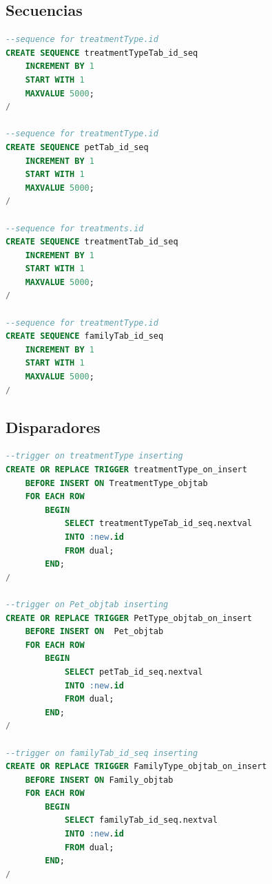 \documentclass{FR16}
\begin{document}
\subsection{Secuencias}
\begin{lstlisting}[language=Sql, basicstyle=\scriptsize]
--sequence for treatmentType.id
CREATE SEQUENCE treatmentTypeTab_id_seq
    INCREMENT BY 1
    START WITH 1
    MAXVALUE 5000;
/

--sequence for treatmentType.id
CREATE SEQUENCE petTab_id_seq
    INCREMENT BY 1
    START WITH 1
    MAXVALUE 5000;
/

--sequence for treatments.id
CREATE SEQUENCE treatmentTab_id_seq
    INCREMENT BY 1
    START WITH 1
    MAXVALUE 5000;
/

--sequence for treatmentType.id
CREATE SEQUENCE familyTab_id_seq
    INCREMENT BY 1
    START WITH 1
    MAXVALUE 5000;
/
\end{lstlisting}
\newpage

\subsection{Disparadores}
\begin{lstlisting}[language=Sql, basicstyle=\scriptsize]
--trigger on treatmentType inserting
CREATE OR REPLACE TRIGGER treatmentType_on_insert
    BEFORE INSERT ON TreatmentType_objtab
    FOR EACH ROW
        BEGIN 
            SELECT treatmentTypeTab_id_seq.nextval
            INTO :new.id
            FROM dual;
        END;
/

--trigger on Pet_objtab inserting
CREATE OR REPLACE TRIGGER PetType_objtab_on_insert
    BEFORE INSERT ON  Pet_objtab
    FOR EACH ROW
        BEGIN 
            SELECT petTab_id_seq.nextval
            INTO :new.id
            FROM dual;
        END;
/        

--trigger on familyTab_id_seq inserting
CREATE OR REPLACE TRIGGER FamilyType_objtab_on_insert
    BEFORE INSERT ON Family_objtab
    FOR EACH ROW
        BEGIN 
            SELECT familyTab_id_seq.nextval
            INTO :new.id
            FROM dual;
        END;
/ 
\end{lstlisting}
\newpage
\end{document}
